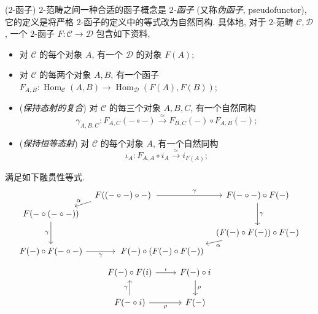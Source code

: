\begin{definition}
	[label={2-functor}]
	{($2$-函子)}
	$2$-范畴之间一种合适的函子概念是 \emph{$2$-函子} (又称\emph{伪函子}, pseudofunctor\footnotemark{}), 它的定义是将严格 $2$-函子的定义中的等式改为自然同构.
	具体地, 对于 $2$-范畴 $\mathcal C,\mathcal D$,
	一个 $2$-函子 $F\colon \mathcal C\to\mathcal D$ 包含如下资料,
	\begin{itemize}
		\item 对 $\mathcal C$ 的每个对象 $A$, 有一个 $\mathcal D$ 的对象 $F(A)$;
		\item 对 $\mathcal C$ 的每两个对象 $A,B$, 有一个函子 $F_{A,B}\colon \operatorname{Hom}_{\mathcal C}(A,B) \to \operatorname{Hom}_{\mathcal D} (F(A),F(B))$;
		\item (\emph{保持态射的复合}) 对 $\mathcal C$ 的每三个对象 $A,B,C$, 有一个自然同构
		$$\gamma_{A,B,C}\colon F_{A,C}(-\circ -) \overset{\simeq}{\to} F_{B,C}(-)\circ F_{A,B}(-);$$
		\item (\emph{保持恒等态射}) 对 $\mathcal C$ 的每个对象 $A$, 有一个自然同构
		$$\iota_A\colon F_{A,A}\circ i_A \overset{\simeq}{\to} i_{F(A)}; $$
	\end{itemize}
	满足如下融贯性等式.
	\vspace{-5pt}%
	\[\begin{tikzcd}[ampersand replacement=\&,sep=tiny]
		\& {F((-\circ -)\circ -)\hspace{-3em}} \&\& {F(-\circ -)\circ F(-)} \\
		{F(-\circ (-\circ -))} \\
		\&\&\& {(F(-)\circ F(-))\circ F(-)} \\
		{F(-)\circ F(-\circ -)} \&\& {\hspace{-2em}F(-)\circ (F(-)\circ F(-))}
		\arrow["\gamma"', from=2-1, to=4-1]
		\arrow["\gamma"'{pos=0.3}, shorten >=22pt, from=4-1, to=4-3]
		\arrow["\gamma", from=1-4, to=3-4]
		\arrow["\gamma"{pos=0.7}, shorten <=32pt, from=1-2, to=1-4]
		\arrow["\alpha"', from=1-2, to=2-1]
		\arrow["\alpha", from=3-4, to=4-3]
	\end{tikzcd}\]
	\[\begin{tikzcd}[ampersand replacement=\&]
		{F(-)\circ F(i)} \& {F(-)\circ i} \\
		{F(-\circ i)} \& {F(-)}
		\arrow["\iota", from=1-1, to=1-2]
		\arrow["\rho", from=1-2, to=2-2]
		\arrow["\gamma", from=2-1, to=1-1]
		\arrow["\rho"', from=2-1, to=2-2]
	\end{tikzcd}\]
\end{definition}
